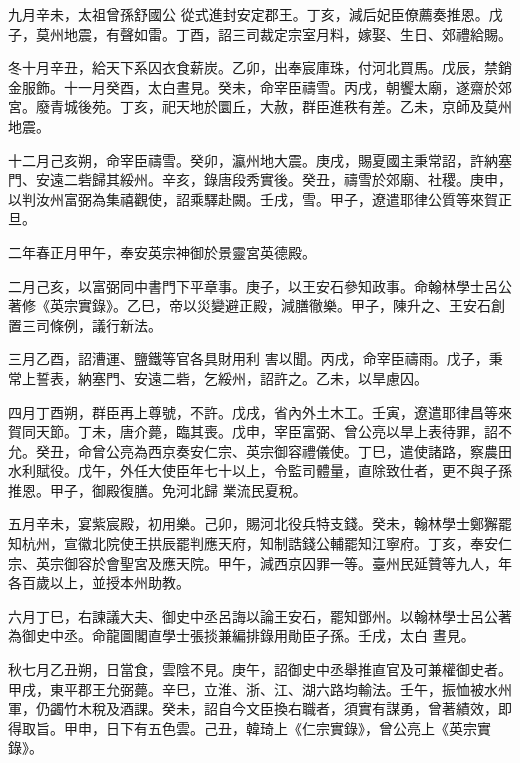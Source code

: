 \begin{pinyinscope}
 九月辛未，太祖曾孫舒國公
 從式進封安定郡王。丁亥，減后妃臣僚薦奏推恩。戊子，莫州地震，有聲如雷。丁酉，詔三司裁定宗室月料，嫁娶、生日、郊禮給賜。



 冬十月辛丑，給天下系囚衣食薪炭。乙卯，出奉宸庫珠，付河北買馬。戊辰，禁銷金服飾。十一月癸酉，太白晝見。癸未，命宰臣禱雪。丙戌，朝饗太廟，遂齋於郊宮。廢青城後苑。丁亥，祀天地於圜丘，大赦，群臣進秩有差。乙未，京師及莫州地震。



 十二月己亥朔，命宰臣禱雪。癸卯，瀛州地大震。庚戌，賜夏國主秉常詔，許納塞
 門、安遠二砦歸其綏州。辛亥，錄唐段秀實後。癸丑，禱雪於郊廟、社稷。庚申，以判汝州富弼為集禧觀使，詔乘驛赴闕。壬戌，雪。甲子，遼遣耶律公質等來賀正旦。



 二年春正月甲午，奉安英宗神御於景靈宮英德殿。



 二月己亥，以富弼同中書門下平章事。庚子，以王安石參知政事。命翰林學士呂公著修《英宗實錄》。乙巳，帝以災變避正殿，減膳徹樂。甲子，陳升之、王安石創置三司條例，議行新法。



 三月乙酉，詔漕運、鹽鐵等官各具財用利
 害以聞。丙戌，命宰臣禱雨。戊子，秉常上誓表，納塞門、安遠二砦，乞綏州，詔許之。乙未，以旱慮囚。



 四月丁酉朔，群臣再上尊號，不許。戊戌，省內外土木工。壬寅，遼遣耶律昌等來賀同天節。丁未，唐介薨，臨其喪。戊申，宰臣富弼、曾公亮以旱上表待罪，詔不允。癸丑，命曾公亮為西京奏安仁宗、英宗御容禮儀使。丁巳，遣使諸路，察農田水利賦役。戊午，外任大使臣年七十以上，令監司體量，直除致仕者，更不與子孫推恩。甲子，御殿復膳。免河北歸
 業流民夏稅。



 五月辛未，宴紫宸殿，初用樂。己卯，賜河北役兵特支錢。癸未，翰林學士鄭獬罷知杭州，宣徽北院使王拱辰罷判應天府，知制誥錢公輔罷知江寧府。丁亥，奉安仁宗、英宗御容於會聖宮及應天院。甲午，減西京囚罪一等。臺州民延贊等九人，年各百歲以上，並授本州助教。



 六月丁巳，右諫議大夫、御史中丞呂誨以論王安石，罷知鄧州。以翰林學士呂公著為御史中丞。命龍圖閣直學士張掞兼編排錄用勛臣子孫。壬戌，太白
 晝見。



 秋七月乙丑朔，日當食，雲陰不見。庚午，詔御史中丞舉推直官及可兼權御史者。甲戌，東平郡王允弼薨。辛巳，立淮、浙、江、湖六路均輸法。壬午，振恤被水州軍，仍蠲竹木稅及酒課。癸未，詔自今文臣換右職者，須實有謀勇，曾著績效，即得取旨。甲申，日下有五色雲。己丑，韓琦上《仁宗實錄》，曾公亮上《英宗實錄》。




\end{pinyinscope}
